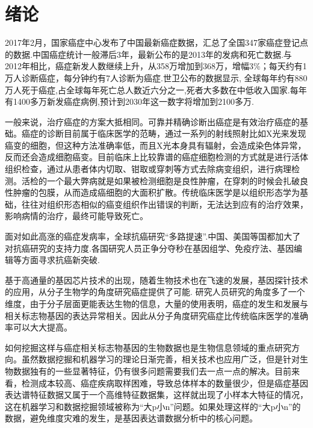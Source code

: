 \documentclass{njubachelor}
\begin{document}
\makectitlepage

\thispagestyle{plain} %
\vspace*{0em}
\maketoc

\newpage
{}

\thispagestyle{plain} %

\section{绪论}

2017年2月，国家癌症中心发布了中国最新癌症数据，汇总了全国347家癌症登记点的数据.中国癌症统计一般滞后3年，最新公布的是2013年的发病和死亡数据.与2012年相比，癌症新发人数继续上升，从358万增加到368万，增幅3\%；每天约有1万人诊断癌症，每分钟约有7人诊断为癌症.世卫公布的数据显示, 全球每年约有880万人死于癌症,占全球每年死亡总人数近六分之一,死者大多数在中低收入国家.每年有1400多万新发癌症病例,预计到2030年这一数字将增加到2100多万.

一般来说，治疗癌症的方案大抵相同。可靠并精确诊断出癌症是有效治疗癌症的基础。癌症的诊断目前属于临床医学的范畴，通过一系列的射线照射比如X光来发现癌变的细胞，但这种方法准确率低，而且X光本身具有辐射，会造成染色体异常，反而还会造成细胞癌变。目前临床上比较靠谱的癌症细胞检测的方式就是进行活体组织检查，通过从患者体内切取、钳取或穿刺等方式去除病变组织，进行病理检测。活检的一个最大弊病就是如果被检测细胞是良性肿瘤，在穿刺的时候会扎破良性肿瘤的包膜，从而造成癌细胞的大面积扩散。传统临床医学是以组织形态学为基础，往往对组织形态相似的癌变组织作出错误的判断，无法达到应有的治疗效果，影响病情的治疗，最终可能导致死亡。

面对如此高涨的癌症发病率，全球抗癌研究“多路提速”.中国、美国等国都加大了对抗癌研究的支持力度.各国研究人员正争分夺秒在基因组学、免疫疗法、基因编辑等方面寻求抗癌新突破.

基于高通量的基因芯片技术的出现，随着生物技术也在飞速的发展，基因探针技术的应用，从分子生物学的角度研究癌症提供了可能. 研究人员研究的角度多了一个维度，由于分子层面更能表达生物的信息，大量的使用表明，癌症的发生和发展与相关标志物基因的表达异常相关。因此从分子角度研究癌症比传统临床医学的准确率可以大大提高。

如何挖掘这样与癌症相关标志物基因的生物数据也是生物信息领域的重点研究方向。虽然数据挖掘和机器学习的理论日渐完善，相关技术也应用广泛，但是针对生物数据独有的一些显著特征，仍有很多问题需要我们去一点一点的解决。目前来看，检测成本较高、癌症疾病取样困难，导致总体样本的数量很少，但是癌症基因表达谱特征数据又属于一个高维特征数据集，这样就出现了小样本大特征的情况，这在机器学习和数据挖掘领域被称为“大p小n”问题。如果处理这样的“大p小n”的数据，避免维度灾难的发生，是基因表达谱数据分析中的核心问题。
\end{document}
